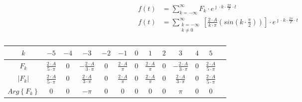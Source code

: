 \begin{task}
\begin{equation}
\begin{aligned}
f(t) &= \sum_{k=-\infty}^{\infty} F_k \cdot e^{\jmath \cdot k \cdot \frac{2\pi}{T} \cdot t}\\
f(t) &= \sum_{\begin{smallmatrix}k=-\infty \\ k \neq 0 \end{smallmatrix}}^{\infty} \left[\frac{2 \cdot A}{k\cdot \pi}\left( sin \left(k \cdot \frac{\pi}{2}\right)\right)\right] \cdot e^{\jmath \cdot k \cdot \frac{2\pi}{T} \cdot t}\\
\end{aligned}
\end{equation}


\begin{table}[H]
    \centering  
    \begin{tabular}{|c|c|c|c|c|c|c|c|c|c|c|c|c|}
        \hline 
        $k$ & $-5$ & $-4$ & $-3$ & $-2$ & $-1$ & $0$ & $1$ & $2$ & $3$ & $4$ & $5$\\ 
        \hline 
        $F_k$ & $\frac{2\cdot A}{5 \cdot \pi}$ & $0$ & $-\frac{2\cdot A}{3 \cdot \pi}$ & $0$ & $\frac{2\cdot A}{\pi}$ & $0$ & $\frac{2\cdot A}{\pi}$ & $0$ & $-\frac{2 \cdot A}{3 \cdot \pi}$ & $0$ & $\frac{2\cdot A}{5 \cdot \pi}$\\ 
        \hline 
        $\left| F_k \right|$ & $\frac{2\cdot A}{5 \cdot \pi}$ & $0$ & $\frac{2\cdot A}{3 \cdot \pi}$ & $0$ & $\frac{2\cdot A}{\pi}$ & $0$ & $\frac{2\cdot A}{\pi}$ & $0$ & $\frac{2 \cdot A}{3 \cdot \pi}$ & $0$ & $\frac{2\cdot A}{5 \cdot \pi}$\\
        \hline
        $Arg\left\{ F_k \right\}$ & $0$ & $0$ & $-\pi$ & $0$ & $0$ & $0$ & $0$ & $0$ & $\pi$ & $0$ & $0$\\
        \hline
    \end{tabular} 
\end{table}


\begin{figure}[H]
    \centering
    \begin{tikzpicture}
    

\end{tikzpicture}
\end{figure}
\end{task}
